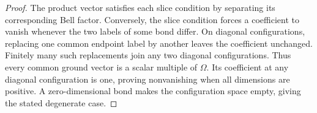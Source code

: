 \begin{proof}\leanok
    The product vector satisfies each slice condition by separating
    its corresponding Bell factor. Conversely, the slice condition
    forces a coefficient to vanish whenever the two labels of some
    bond differ. On diagonal configurations, replacing one common
    endpoint label by another leaves the coefficient unchanged.
    Finitely many such replacements join any two diagonal configurations.
    Thus every common ground vector is a scalar multiple of $\Omega$.
    Its coefficient at any diagonal configuration is one, proving
    nonvanishing when all dimensions are positive. A zero-dimensional
    bond makes the configuration space empty, giving the stated
    degenerate case.
\end{proof}
